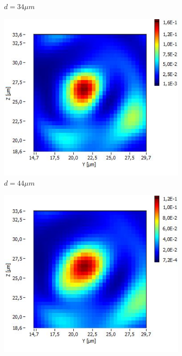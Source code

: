 \documentclass[a4paper,11pt]{article}
\begin{document}
\begin{figure}[htb]
\begin{subfigure}[b]{.19\linewidth}
    \caption{$d=34\mu m$}
  \end{subfigure}
  \begin{subfigure}[b]{.19\linewidth}
    \centering
    \includegraphics[width=\textwidth]{Fibre6/scan_010_g1.jpg}
    \caption{$d=44\mu m$}
  \end{subfigure}
  \begin{subfigure}[b]{.19\linewidth}
    \centering
    \includegraphics[width=\textwidth]{Fibre6/scan_011_g1.jpg}

\end{subfigure}
\end{figure}
\end{document}
